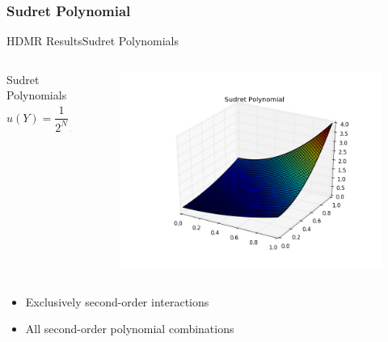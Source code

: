 \documentclass{beamer}
\begin{document}
\subsubsection{Sudret Polynomial}
\begin{frame}{HDMR Results}{Sudret Polynomials}\vspace{-20pt}
  \begin{columns}
    \begin{column}{0.6\textwidth}
      \begin{block}{Sudret Polynomials}
        \[u(Y) = \frac{1}{2^N}\prod_{n=1}^N (3y_n^2+1)\]
      \end{block}
    \end{column}
    \begin{column}{0.4\textwidth}
        \begin{figure}[h!]
          \centering
          \includegraphics[width=\linewidth]{anlmodels/sudret}
        \end{figure}
    \end{column}
  \end{columns}
  \begin{itemize}
    \item Exclusively second-order interactions
    \item All second-order polynomial combinations
  \end{itemize}
\end{frame}
\end{document}
